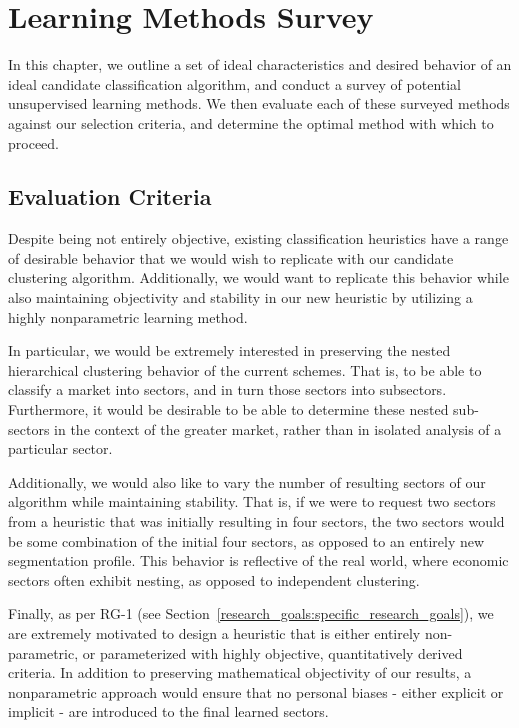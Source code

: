 \documentclass[../main.tex]{subfiles}
\begin{document}
    
\chapter{Learning Methods Survey} \label{learning_methods_survey}


In this chapter, we outline a set of ideal characteristics and desired behavior of an ideal candidate classification algorithm, and conduct a survey of potential unsupervised learning methods. We then evaluate each of these surveyed methods against our selection criteria, and determine the optimal method with which to proceed.

\section{Evaluation Criteria}

Despite being not entirely objective, existing classification heuristics have a range of desirable behavior that we would wish to replicate with our candidate clustering algorithm. Additionally, we would want to replicate this behavior while also maintaining objectivity and stability in our new heuristic by utilizing a highly nonparametric learning method.

In particular, we would be extremely interested in preserving the nested hierarchical clustering behavior of the current schemes. That is, to be able to classify a market into sectors, and in turn those sectors into subsectors. Furthermore, it would be desirable to be able to determine these nested sub-sectors in the context of the greater market, rather than in isolated analysis of a particular sector.

Additionally, we would also like to vary the number of resulting sectors of our algorithm while maintaining stability. That is, if we were to request two sectors from a heuristic that was initially resulting in four sectors, the two sectors would be some combination of the initial four sectors, as opposed to an entirely new segmentation profile. This behavior is reflective of the real world, where economic sectors often exhibit nesting, as opposed to independent clustering.

Finally, as per RG-1 (see Section~\ref{research_goals:specific_research_goals}), we are extremely motivated to design a heuristic that is either entirely non-parametric, or parameterized with highly objective, quantitatively derived criteria. In addition to preserving mathematical objectivity of our results, a nonparametric approach would ensure that no personal biases - either explicit or implicit - are introduced to the final learned sectors.
\end{document}
